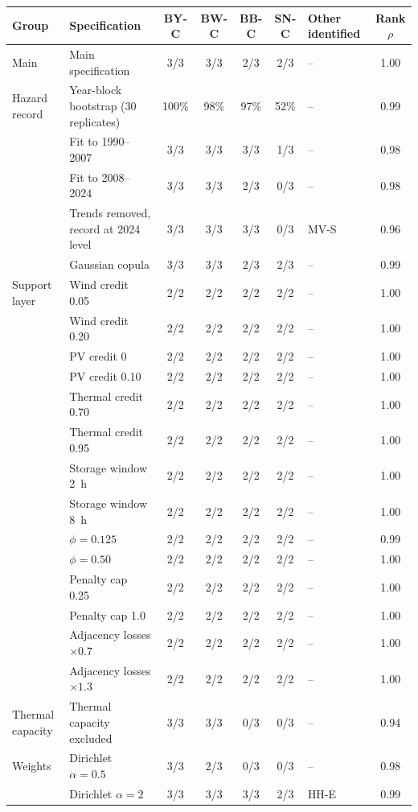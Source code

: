 \begin{tabular}{@{}p{2.9cm}p{5.4cm}ccccp{3.1cm}c@{}}
\toprule
Group & Specification & BY-C & BW-C & BB-C & SN-C & Other identified & Rank $\rho$ \\
\midrule
Main & Main specification & 3/3 & 3/3 & 2/3 & 2/3 & -- & 1.00 \\
\midrule
Hazard record & Year-block bootstrap (30 replicates) & 100\% & 98\% & 97\% & 52\% & -- & 0.99 \\
 & Fit to 1990--2007 & 3/3 & 3/3 & 3/3 & 1/3 & -- & 0.98 \\
 & Fit to 2008--2024 & 3/3 & 3/3 & 2/3 & 0/3 & -- & 0.98 \\
 & Trends removed, record at 2024 level & 3/3 & 3/3 & 3/3 & 0/3 & MV-S & 0.96 \\
 & Gaussian copula & 3/3 & 3/3 & 2/3 & 2/3 & -- & 0.99 \\
\midrule
Support layer & Wind credit 0.05 & 2/2 & 2/2 & 2/2 & 2/2 & -- & 1.00 \\
 & Wind credit 0.20 & 2/2 & 2/2 & 2/2 & 2/2 & -- & 1.00 \\
 & PV credit 0 & 2/2 & 2/2 & 2/2 & 2/2 & -- & 1.00 \\
 & PV credit 0.10 & 2/2 & 2/2 & 2/2 & 2/2 & -- & 1.00 \\
 & Thermal credit 0.70 & 2/2 & 2/2 & 2/2 & 2/2 & -- & 1.00 \\
 & Thermal credit 0.95 & 2/2 & 2/2 & 2/2 & 2/2 & -- & 1.00 \\
 & Storage window 2~h & 2/2 & 2/2 & 2/2 & 2/2 & -- & 1.00 \\
 & Storage window 8~h & 2/2 & 2/2 & 2/2 & 2/2 & -- & 1.00 \\
 & $\phi=0.125$ & 2/2 & 2/2 & 2/2 & 2/2 & -- & 0.99 \\
 & $\phi=0.50$ & 2/2 & 2/2 & 2/2 & 2/2 & -- & 1.00 \\
 & Penalty cap 0.25 & 2/2 & 2/2 & 2/2 & 2/2 & -- & 1.00 \\
 & Penalty cap 1.0 & 2/2 & 2/2 & 2/2 & 2/2 & -- & 1.00 \\
 & Adjacency losses $\times0.7$ & 2/2 & 2/2 & 2/2 & 2/2 & -- & 1.00 \\
 & Adjacency losses $\times1.3$ & 2/2 & 2/2 & 2/2 & 2/2 & -- & 1.00 \\
\midrule
Thermal capacity & Thermal capacity excluded & 3/3 & 3/3 & 0/3 & 0/3 & -- & 0.94 \\
\midrule
Weights & Dirichlet $\alpha=0.5$ & 3/3 & 2/3 & 0/3 & 0/3 & -- & 0.98 \\
 & Dirichlet $\alpha=2$ & 3/3 & 3/3 & 3/3 & 2/3 & HH-E & 0.99 \\

\end{tabular}
